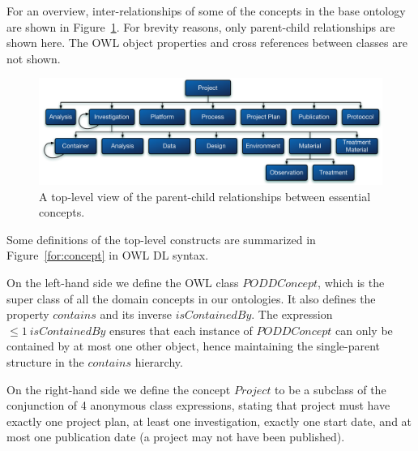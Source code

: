 \documentclass[preprint,12pt]{elsarticle}
\begin{document}
For an overview, inter-relationships of some of the concepts in the base ontology are shown in Figure~\ref{fig:ont}. For brevity reasons, only parent-child relationships are shown here. The OWL object properties and cross references between classes are not shown. 

\begin{figure}[htb]
\centering
\includegraphics[width=\textwidth]{top_ont.pdf}
\vspace{-16pt}
\caption{A top-level view of the parent-child relationships between essential concepts.}\label{fig:ont}
\end{figure}

Some definitions of the top-level constructs are summarized in Figure~\ref{for:concept} in OWL DL syntax. 

On the left-hand side we define the OWL class $PODDConcept$, which is the super class of all the domain concepts in our ontologies. It also defines the property $contains$ and its inverse $isContainedBy$. The expression $\leq 1~ isContainedBy$ ensures that each instance of $PODDConcept$ can only be contained by at most one other object, hence maintaining the single-parent structure in the $contains$ hierarchy.

On the right-hand side we define the concept $Project$ to be a subclass of the conjunction of 4 anonymous class expressions, stating that project must have exactly one project plan, at least one investigation, exactly one start date, and at most one publication date (a project may not have been published).
\end{document}
